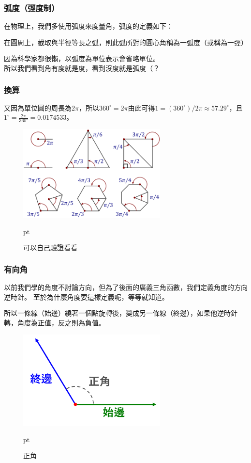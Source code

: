 \subsubsection{弧度（弳度制）}
在物理上，我們多使用弧度來度量角，弧度的定義如下：

\begin{center}
{\Kai 在圓周上，截取與半徑等長之弧，則此弧所對的圓心角稱為一弧度（或稱為一弳）} 
\end{center}

\noindent
因為科學家都很懶，以弧度為單位表示會省略單位。\\
所以我們看到角有度就是度，看到沒度就是弧度（？\\

\subsubsection{換算}
又因為單位圓的周長為$2\pi$，所以$360^\circ=2\pi$由此可得$1=(360^\circ )/2\pi \approx 57.29^\circ$，且$1^\circ=\frac{2\pi}{360^\circ}=0.0174533$。
\begin{figure}[H]
\centering
\graphicspath{{physics/}}
\includegraphics[width=7.5cm, center]{num-shape.png}
\caption{可以自己驗證看看}  pt
\label{fig:num-shape}
\end{figure}
\subsubsection{有向角}
以前我們學的角度不討論方向，但為了後面的廣義三角函數，我們定義角度的方向逆時針。
至於為什麼角度要這樣定義呢，等等就知道。 

所以一條線（始邊）繞著一個點旋轉後，變成另一條線（終邊），如果他逆時針轉，角度為正值，反之則為負值。

\begin{figure}[H]
\centering
\graphicspath{{physics/}}
\includegraphics[width=7.5cm, center]{pos-angle.png}
\caption{正角}  pt
\label{fig:pos-angle}
\end{figure}

